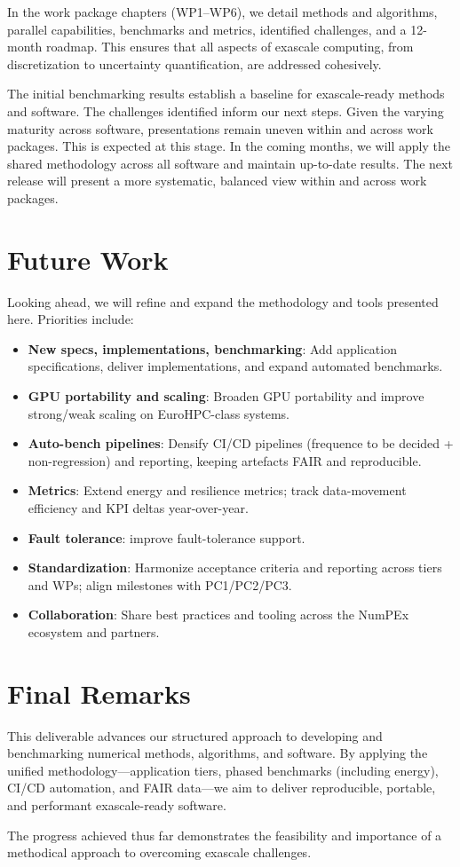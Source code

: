 In the work package chapters (WP1--WP6), we detail methods and algorithms, parallel capabilities, benchmarks and metrics, identified challenges, and a 12-month roadmap. 
This ensures that all aspects of exascale computing, from discretization to uncertainty quantification, are addressed cohesively.

The initial benchmarking results establish a baseline for exascale-ready methods and software. 
The challenges identified inform our next steps. Given the varying maturity across software, presentations remain uneven within and across work packages. This is expected at this stage. In the coming months, we will apply the shared methodology across all software and maintain up-to-date results. The next release will present a more systematic, balanced view within and across work packages.


\section*{Future Work}

Looking ahead, we will refine and expand the methodology and tools presented here. 
Priorities include:

\begin{itemize}
    \item \textbf{New specs, implementations, benchmarking}: Add application specifications, deliver implementations, and expand automated benchmarks.
    \item \textbf{GPU portability and scaling}: Broaden GPU portability and improve strong/weak scaling on EuroHPC-class systems.
    \item \textbf{Auto-bench pipelines}: Densify CI/CD pipelines (frequence to be decided + non-regression) and reporting, keeping artefacts FAIR and reproducible.
    \item \textbf{Metrics}: Extend energy and resilience metrics; track data-movement efficiency and KPI deltas year-over-year.
    \item \textbf{Fault tolerance}: improve fault-tolerance support.
    \item \textbf{Standardization}: Harmonize acceptance criteria and reporting across tiers and WPs; align milestones with PC1/PC2/PC3.
    \item \textbf{Collaboration}: Share best practices and tooling across the NumPEx ecosystem and partners.
\end{itemize}

\section*{Final Remarks}

This deliverable advances our structured approach to developing and benchmarking numerical methods, algorithms, and software. By applying the unified methodology—application tiers, phased benchmarks (including energy), CI/CD automation, and FAIR data—we aim to deliver reproducible, portable, and performant exascale-ready software.

The progress achieved thus far demonstrates the feasibility and importance of a methodical approach to overcoming exascale challenges. 


